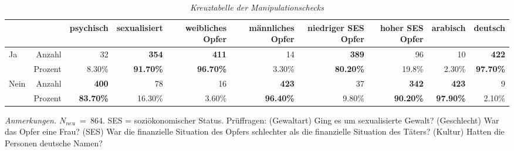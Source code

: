 \begin{table}[htb]
    \caption[Kreuztabelle Manipulationscheck]{\textit {Kreuztabelle der Manipulationschecks}} 
    \label{Kreuztabelle}
    \centering
    \begin{adjustbox}{width=\textwidth}
    \small
    \begin{tabular}{lrrrrrrrrr}
      \hline
        &   & psychisch & sexualisiert & weibliches Opfer & männliches Opfer & niedriger SES Opfer & hoher SES Opfer & arabisch & deutsch \\
      \hline
    Ja   & Anzahl  & 32      & \textbf{354}     & \textbf{411}      & 14      & \textbf{389}      & 96      & 10      & \textbf{422}      \\
         & Prozent & 8.30\%  & \textbf{91.70\%} & \textbf{96.70\%}  & 3.30\%  & \textbf{80.20\%}  & 19.8\%  & 2.30\%  & \textbf{97.70\%}  \\
    Nein & Anzahl  & \textbf{400}     & 78      & 16       & \textbf{423}     & 37       & \textbf{342}     & \textbf{423}     & 9        \\
         & Prozent & \textbf{83.70\%} & 16.30\% & 3.60\%   & \textbf{96.40\%} & 9.80\%   & \textbf{90.20\%} & \textbf{97.90\%} & 2.10\%   \\
       \hline
    \end{tabular}
    \end{adjustbox}
    
    \begin{tablenotes}
        \item \textit{Anmerkungen.} \( N_{neu} \)~=~864. SES = soziökonomischer Status. Prüffragen: (Gewaltart) Ging es um sexualisierte Gewalt? (Geschlecht) War das Opfer eine Frau? (SES) War die finanzielle Situation des Opfers schlechter als die finanzielle Situation des Täters? (Kultur) Hatten die Personen deutsche Namen?
      \end{tablenotes}
    \end{table}

    